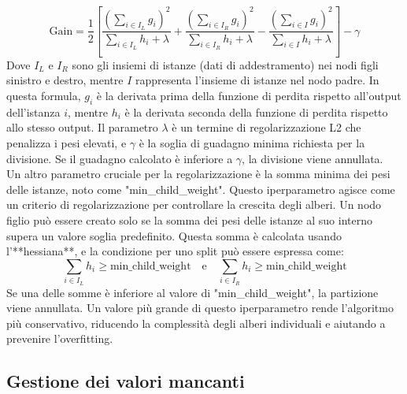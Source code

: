\documentclass[a4paper,12pt]{report}
\begin{document}
	$$
	\text{Gain} = \frac{1}{2} \left[ \frac{(\sum_{i \in I_L} g_i)^2}{\sum_{i \in I_L} h_i + \lambda} + \frac{(\sum_{i \in I_R} g_i)^2}{\sum_{i \in I_R} h_i + \lambda} - \frac{(\sum_{i \in I} g_i)^2}{\sum_{i \in I} h_i + \lambda} \right] - \gamma
	$$
	Dove $I_L$ e $I_R$ sono gli insiemi di istanze (dati di addestramento) nei nodi figli sinistro e destro, mentre $I$ rappresenta l'insieme di istanze nel nodo padre. In questa formula, $g_i$ è la derivata prima della funzione di perdita rispetto all'output dell'istanza $i$, mentre $h_i$ è la derivata seconda della funzione di perdita rispetto allo stesso output. Il parametro $\lambda$ è un termine di regolarizzazione L2 che penalizza i pesi elevati, e $\gamma$ è la soglia di guadagno minima richiesta per la divisione. Se il guadagno calcolato è inferiore a $\gamma$, la divisione viene annullata. \\
	Un altro parametro cruciale per la regolarizzazione è la somma minima dei pesi delle istanze, noto come "min\_child\_weight". Questo iperparametro agisce come un criterio di regolarizzazione per controllare la crescita degli alberi. Un nodo figlio può essere creato solo se la somma dei pesi delle istanze al suo interno supera un valore soglia predefinito. Questa somma è calcolata usando l'**hessiana**, e la condizione per uno split può essere espressa come:
	$$ \sum_{i \in I_L} h_i \ge \text{min\_child\_weight} \quad \text{e} \quad \sum_{i \in I_R} h_i \ge \text{min\_child\_weight} $$
	Se una delle somme è inferiore al valore di "min\_child\_weight", la partizione viene annullata. Un valore più grande di questo iperparametro rende l'algoritmo più conservativo, riducendo la complessità degli alberi individuali e aiutando a prevenire l'overfitting.
	
	\subsection{Gestione dei valori mancanti}
	
\end{document}
